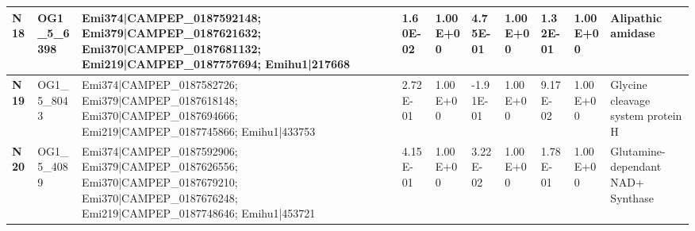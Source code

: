 \begin{landscape}
\begin{center}
\begin{footnotesize}
\begin{longtable}{|p{0.5cm}|p{1.5cm}|p{4cm}|l|l|l|l|l|l|l|}
\textbf{N18} & OG1\_5\_6398  & Emi374|CAMPEP\_0187592148; Emi379|CAMPEP\_0187621632; Emi370|CAMPEP\_0187681132; Emi219|CAMPEP\_0187757694; Emihu1|217668                                                                                                                                                                                                                                                                                                                                                                                                                                                                                                                & 1.60E-02  & 1.00E+00 & 4.75E-01  & 1.00E+00 & 1.32E-01  & 1.00E+00 & Alipathic amidase                                                            \\ \hline
\textbf{N19} & OG1\_5\_8043  & Emi374|CAMPEP\_0187582726; Emi379|CAMPEP\_0187618148; Emi370|CAMPEP\_0187694666; Emi219|CAMPEP\_0187745866; Emihu1|433753                                                                                                                                                                                                                                                                                                                                                                                                                                                                                                                & 2.72E-01  & 1.00E+00 & -1.91E-01 & 1.00E+00 & 9.17E-02  & 1.00E+00 & Glycine cleavage system protein H                                            \\ \hline
\textbf{N20} & OG1\_5\_4089  & Emi374|CAMPEP\_0187592906; Emi379|CAMPEP\_0187626556; Emi370|CAMPEP\_0187679210; Emi370|CAMPEP\_0187676248; Emi219|CAMPEP\_0187748646; Emihu1|453721                                                                                                                                                                                                                                                                                                                                                                                                                                                                                     & 4.15E-01  & 1.00E+00 & 3.22E-02  & 1.00E+00 & 1.78E-01  & 1.00E+00 & Glutamine-dependant NAD+ Synthase                                            \\ \hline

\end{longtable}
\end{footnotesize}
\end{center}
\end{landscape}
